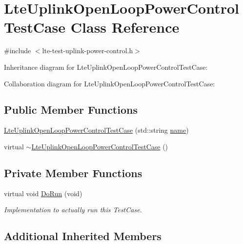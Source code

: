 \hypertarget{classLteUplinkOpenLoopPowerControlTestCase}{}\section{Lte\+Uplink\+Open\+Loop\+Power\+Control\+Test\+Case Class Reference}
\label{classLteUplinkOpenLoopPowerControlTestCase}


{\ttfamily \#include $<$lte-\/test-\/uplink-\/power-\/control.\+h$>$}



Inheritance diagram for Lte\+Uplink\+Open\+Loop\+Power\+Control\+Test\+Case\+:


Collaboration diagram for Lte\+Uplink\+Open\+Loop\+Power\+Control\+Test\+Case\+:
\subsection*{Public Member Functions}
\begin{DoxyCompactItemize}
\item 
\hyperlink{classLteUplinkOpenLoopPowerControlTestCase_ab0adc4b0960ea79807d3f320a6927f5f}{Lte\+Uplink\+Open\+Loop\+Power\+Control\+Test\+Case} (std\+::string \hyperlink{generate__test__data__lte__spectrum__model_8m_ab74e6bf80237ddc4109968cedc58c151}{name})
\item 
virtual \hyperlink{classLteUplinkOpenLoopPowerControlTestCase_a51c3cc235020573bb14a1bba0593e549}{$\sim$\+Lte\+Uplink\+Open\+Loop\+Power\+Control\+Test\+Case} ()
\end{DoxyCompactItemize}
\subsection*{Private Member Functions}
\begin{DoxyCompactItemize}
\item 
virtual void \hyperlink{classLteUplinkOpenLoopPowerControlTestCase_a1cd67f8fd6b950e1a92142dec9e4af10}{Do\+Run} (void)
\begin{DoxyCompactList}\small\item\em Implementation to actually run this Test\+Case. \end{DoxyCompactList}\end{DoxyCompactItemize}
\subsection*{Additional Inherited Members}


